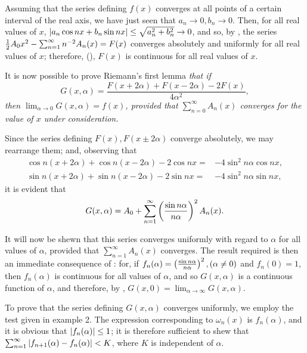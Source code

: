 Assuming that the series defining $f(x)$ converges at all points of a
certain interval of the real axis, we have just seen that
$a_{n} \rightarrow 0, b_{n} \rightarrow 0$. Then, for all real values of
$x$,
$\left| a_{n} \cos nx + b_{n} \sin nx \right| \leq \sqrt{a_{n}^{2} + b_{n}^{2}} \rightarrow 0$,
and so, by , the
series
$\frac{1}{2} A_{0} x^{2} - \sum_{n=1}^{\infty} n^{-2} A_{n}(x) = F(x)$
converges absolutely and uniformly for
all real values of $x$; therefore, (), $F(x)$ is continuous for all
real values of $x$.

It is now possible to prove Riemann's first lemma \emph{that if
  $$
  G(x, \alpha)
  =
  \frac{F(x + 2\alpha) + F(x - 2\alpha) - 2F(x)}{4 \alpha^{2}},
  $$
  then $\lim_{\alpha \rightarrow 0} G(x,\alpha) = f(x)$, provided that
  $\sum_{n=0}^{\infty} A_{n}(x)$ converges for the value
  of $x$ under consideration.}

Since the series defining $F(x), F(x \pm 2\alpha)$ converge absolutely, we may
rearrange them; and, observing that
\begin{align*}
  \cos n(x + 2\alpha) + \cos n(x - 2\alpha) - 2 \cos nx =& -4 \sin^{2} n\alpha \cos nx,\\
  \sin n(x + 2\alpha) + \sin n(x - 2\alpha) - 2 \sin nx =& -4 \sin^{2} n\alpha \sin nx,
\end{align*}
it is evident that
$$
G(x, \alpha)
=
A_{0}
+
\sum_{n=1}^{\infty}
\left( 
  \frac{\sin n\alpha}{n\alpha}
 \right)^{2}
A_{n}(x).
$$

It will now be shewn that this series converges uniformly with regard
to $\alpha$ for all values of $\alpha$, provided that
$\sum_{n=1}^{\infty} A_{n}(x)$ converges. The result
required is then an immediate consequence of :
for, if
$f_{n}(\alpha) = \left( 
  \frac{\sin n\alpha}{n\alpha}
 \right)^{2}, (\alpha \neq 0)$
and $f_{n}(0) = 1$, then $f_{n}(\alpha)$ is continuous for all values of $\alpha$, and so
$G(x,\alpha)$ is a continuous function of $\alpha$, and therefore, by ,
$G(x, 0) = \lim_{\alpha \rightarrow \infty} G (x, \alpha)$.

To prove that the series defining $G(x, \alpha)$ converges uniformly, we
employ the test given in  example 2. %
The expression corresponding to $\omega_{n}(x)$ is
$f_{n}(\alpha)$, and it is obvious that
$\left| f_{n}(\alpha) \right| \leq 1$; it is therefore sufficient to shew
that
$\sum_{n=1}^{\infty} \left| f_{n+1}(\alpha) - f_{n}(\alpha) \right| < K$,
where $K$ is independent of $\alpha$.

